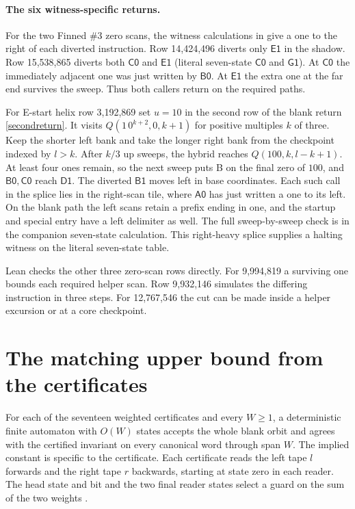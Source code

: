 \documentclass[11pt]{article}
\newcommand{\state}[1]{\mathsf{#1}}
\begin{document}
\paragraph{The six witness-specific returns.}
For the two Finned \#3 zero scans, the witness calculations in \cite{detours} give a one to the right of each diverted instruction. Row 14,424,496 diverts only \(\state{E1}\) in the shadow. Row 15,538,865 diverts both \(\state{C0}\) and \(\state{E1}\) (literal seven-state \(\state{C0}\) and \(\state{G1}\)). At \(\state{C0}\) the immediately adjacent one was just written by \(\state{B0}\). At \(\state{E1}\) the extra one at the far end survives the sweep. Thus both callers return on the required paths.

For E-start helix row 3,192,869 set \(u=10\) in the second row of the blank return \eqref{secondreturn}. It visits \(Q(1\,0^{k+2},0,k+1)\) for positive multiples \(k\) of three. Keep the shorter left bank and take the longer right bank from the checkpoint indexed by \(l>k\). After \(k/3\) up sweeps, the hybrid reaches \(Q(100,k,l-k+1)\). At least four ones remain, so the next sweep puts B on the final zero of \(100\), and \(\state{B0,C0}\) reach \(\state{D1}\). The diverted \(\state{B1}\) moves left in base coordinates. Each such call in the splice lies in the right-scan tile, where \(\state{A0}\) has just written a one to its left. On the blank path the left scans retain a prefix ending in one, and the startup and special entry have a left delimiter as well. The full sweep-by-sweep check is in the companion seven-state calculation. This right-heavy splice supplies a halting witness on the literal seven-state table.

Lean checks the other three zero-scan rows directly. For 9,994,819 a surviving one bounds each required helper scan. Row 9,932,146 simulates the differing instruction in three steps. For 12,767,546 the cut can be made inside a helper excursion or at a core checkpoint.

\appendix
\section{The matching upper bound from the certificates}\label{upper}

For each of the seventeen weighted certificates and every \(W\ge1\), a deterministic finite automaton with \(O(W)\) states accepts the whole blank orbit and agrees with the certified invariant on every canonical word through span \(W\). The implied constant is specific to the certificate. Each certificate reads the left tape \(l\) forwards and the right tape \(r\) backwards, starting at state zero in each reader. The head state and bit and the two final reader states select a guard on the sum of the two weights \cite[\S4.7]{bb5}.
\end{document}
